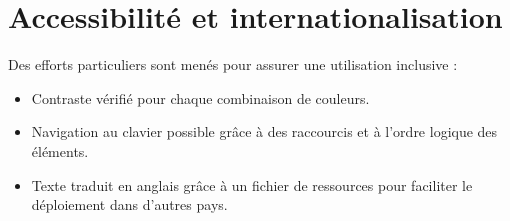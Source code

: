 \section{Accessibilité et internationalisation}
Des efforts particuliers sont menés pour assurer une utilisation inclusive :
\begin{itemize}
    \item Contraste vérifié pour chaque combinaison de couleurs.
    \item Navigation au clavier possible grâce à des raccourcis et à l'ordre logique des éléments.
    \item Texte traduit en anglais grâce à un fichier de ressources pour faciliter le déploiement dans d'autres pays.
\end{itemize}
